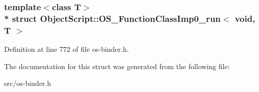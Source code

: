 \subsubsection*{template$<$class T$>$\\*
struct Object\+Script\+::\+O\+S\+\_\+\+Function\+Class\+Imp0\+\_\+run$<$ void, T                           $>$}



Definition at line 772 of file os-\/binder.\+h.



The documentation for this struct was generated from the following file\+:\begin{DoxyCompactItemize}
\item 
src/os-\/binder.\+h\end{DoxyCompactItemize}
